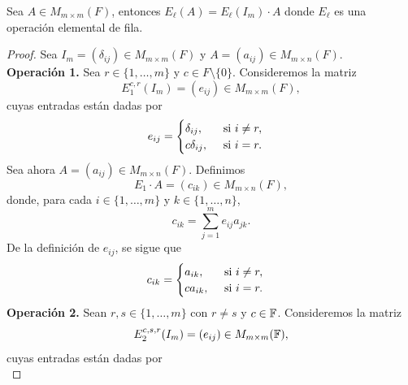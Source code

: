 \documentclass[12pt,a4paper]{book}
\begin{document}
    \begin{teorema}
    \label{teo:2}
        Sea $A\in M_{m\times m}(F)$, entonces $E_{\ell}(A)=E_{\ell}(I_{m})\cdot A$ donde
        $E_{\ell}$ es una operación elemental de fila.
    \end{teorema}
    \begin{proof}
        Sea $I_{m}=(\delta_{ij})\in M_{m\times m}(F)$ y $A=(a_{ij})\in M_{m\times n}(F)$.\\
        \textbf{Operación 1.} Sea $r\in\{1,\dots,m\}$ y $c\in F\setminus\{0\}$. Consideremos
        la matriz
        \begin{equation*}
            E_{1}^{c,r}(I_{m})=(e_{ij})\in M_{m\times m}(F),
        \end{equation*}
        cuyas entradas están dadas por
        \begin{equation*}
            e_{ij}=
            \begin{cases}
                \delta_{ij},\hfill\text{ si }i\neq r,\\
                c\delta_{ij},\quad\text{ si }i=r.
            \end{cases}
        \end{equation*}
        Sea ahora $A=(a_{ij})\in M_{m\times n}(F)$. Definimos
        \begin{equation*}
            E_{1}\cdot A=(c_{ik})\in M_{m\times n}(F),
        \end{equation*}
        donde, para cada $i\in\{1,\dots,m\}$ y $k\in\{1,\dots,n\}$,
        \begin{equation*}
            c_{ik}=\sum_{j=1}^{m}e_{ij}a_{jk}.
        \end{equation*}
        De la definición de $e_{ij}$, se sigue que
        \begin{equation*}
            c_{ik}=
            \begin{cases}
                a_{ik},\hfill\text{ si }i\neq r,\\
                ca_{ik},\quad\text{ si }i=r.
            \end{cases}
        \end{equation*}
        \textbf{Operación 2.} Sean $r,s\in\{1,\dots,m\}$ con $r\neq s$ y $c\in \mathbb{F}$. Consideremos la matriz
        \begin{equation*}
            E_{2}^{c,s,r}(I_{m})=(e_{ij})\in M_{m\times m}(\mathbb{F}),
        \end{equation*}
        cuyas entradas están dadas por
        \begin{equation*}

\end{equation*}
\end{proof}
\end{document}
